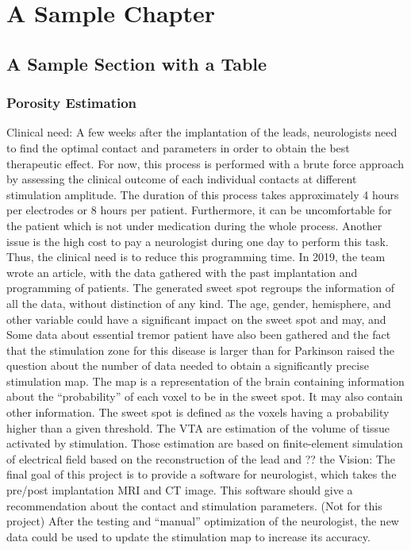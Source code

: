 %
%
%

\chapter{A Sample Chapter}

\section{A Sample Section with a Table}

\subsection{Porosity Estimation}

Clinical need:
A few weeks after the implantation of the leads, neurologists need to find the optimal contact and parameters in order to obtain the best therapeutic effect. For now, this process is performed with a brute force approach by assessing the clinical outcome of each individual contacts at different stimulation amplitude. The duration of this process takes approximately 4 hours per electrodes or 8 hours per patient. Furthermore, it can be uncomfortable for the patient which is not under medication during the whole process. Another issue is the high cost to pay a neurologist during one day to perform this task. Thus, the clinical need is to reduce this programming time.
In 2019, the team wrote an article, with the data gathered with the past implantation and programming of patients. The generated sweet spot regroups the information of all the data, without distinction of any kind. The age, gender, hemisphere, and other variable could have a significant impact on the sweet spot and may, and 
Some data about essential tremor patient have also been gathered and the fact that the stimulation zone for this disease is larger than for Parkinson raised the question about the number of data needed to obtain a significantly precise stimulation map. 
The map is a representation of the brain containing information about the “probability” of each voxel to be in the sweet spot. It may also contain other information. The sweet spot is defined as the voxels having a probability higher than a given threshold. The VTA are estimation of the volume of tissue activated by stimulation. Those estimation are based on finite-element simulation of electrical field based on the reconstruction of the lead and ?? the 
Vision:
The final goal of this project is to provide a software for neurologist, which takes the pre/post implantation MRI and CT image. This software should give a recommendation about the contact and stimulation parameters. (Not for this project) After the testing and “manual” optimization of the neurologist, the new data could be used to update the stimulation map to increase its accuracy.

